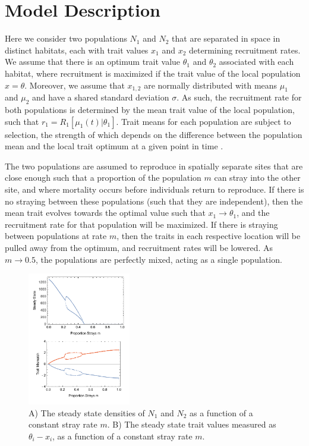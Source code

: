 \documentclass[twocolumn,preprintnumbers,amsmath,amssymb,superscriptaddress]{revtex4}
\begin{document}




\section{Model Description}

Here we consider two populations $N_1$ and $N_2$ that are separated in space in distinct habitats, each with trait values $x_1$ and $x_2$ determining recruitment rates.
We assume that there is an optimum trait value $\theta_1$ and $\theta_2$ associated with each habitat, where recruitment is maximized if the trait value of the local population $x = \theta$.
Moreover, we assume that $x_{1,2}$ are normally distributed with means $\mu_1$ and $\mu_2$ and have a shared standard deviation $\sigma$.
As such, the recruitment rate for both populations is determined by the mean trait value of the local population, such that $r_1 = R_1[\mu_1(t)|\theta_1]$.
Trait means for each population are subject to selection, the strength of which depends on the difference between the population mean and the local trait optimum at a given point in time \cite{simpson1953major,Lande:1976ga}.

The two populations are assumed to reproduce in spatially separate sites that are close enough such that a proportion of the population $m$ can stray into the other site, and where mortality occurs before individuals return to reproduce.
If there is no straying between these populations (such that they are independent), then the mean trait evolves towards the optimal value such that $x_1 \rightarrow \theta_1$, and the recruitment rate for that population will be maximized.
If there is straying between populations at rate $m$, then the traits in each respective location will be pulled away from the optimum, and recruitment rates will be lowered.
As $m \rightarrow 0.5$, the populations are perfectly mixed, acting as a single population.

\begin{figure}
  \captionsetup{justification=raggedright,
singlelinecheck=false
}
\centering
\includegraphics[width=0.4\textwidth]{figs/fig_Density.pdf}
\caption{
A) The steady state densities of $N_1$ and $N_2$ as a function of a constant stray rate $m$.
B) The steady state trait values measured as $\theta_i - x_i$, as a function of a constant stray rate $m$. 
} \label{fig:traj}
\end{figure}
\end{document}
